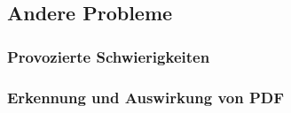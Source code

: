 \subsection{Andere Probleme}
\subsubsection{Provozierte Schwierigkeiten}
\subsubsection{Erkennung und Auswirkung von PDF}\label{subsubsec:problems:pdfinclusion}